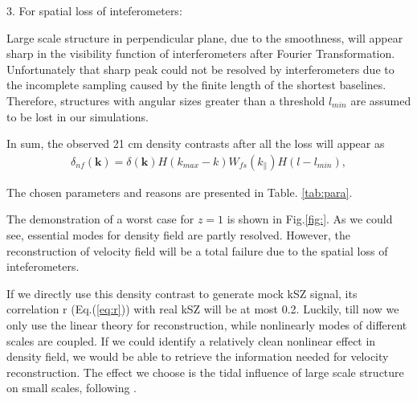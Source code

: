 3. For spatial loss of inteferometers:

Large scale structure in perpendicular plane, due to the smoothness, 
will appear sharp in the visibility function of interferometers 
after Fourier Transformation. 
Unfortunately that sharp peak could not be resolved by interferometers 
due to the incomplete sampling  
caused by the finite length of the shortest baselines. 
Therefore, structures with angular sizes greater than a threshold $l_{min}$ 
are assumed to be lost in our simulations. 

In sum, the observed 21 cm density contrasts after all the loss will appear as 
\begin{eqnarray}
\label{eq:ns}
    \delta_{nf}(\bm{k})=\delta(\bm{k})H(k_{max}-k)W_{fs}(k_\parallel)H(l-l_{min}),
\end{eqnarray}

The chosen parameters and reasons are presented in Table. \ref{tab:para}.

The demonstration of a worst case for $z=1$ is shown in Fig.\ref{fig:}. 
As we could see, essential modes for density field are partly resolved. 
However, the reconstruction of velocity field will be a total failure 
due to the spatial loss of inteferometers. 

If we directly use this density contrast to generate mock kSZ signal, 
its correlation r (Eq.(\ref{eq:r})) with real kSZ will be at most 0.2.
Luckily, till now we only use the linear theory for reconstruction, 
while nonlinearly modes of different scales are coupled. 
If we could identify a relatively clean nonlinear effect in density field, 
we would be able to retrieve the information needed for velocity reconstruction. 
The effect we choose is the tidal influence of large scale structure on small 
scales, following \cite{2015:zhu,2012:pen}.  






